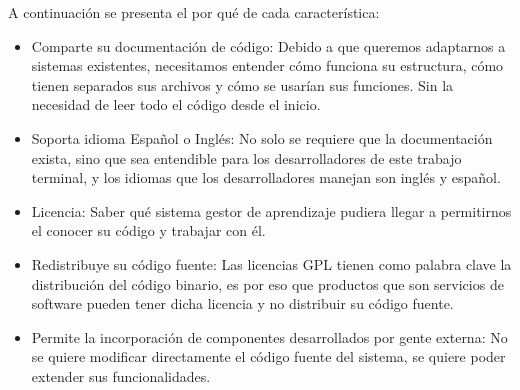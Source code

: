     \noindent A continuación se presenta el por qué de cada característica:
    \begin{itemize}
        \item Comparte su documentación de código: Debido a que queremos adaptarnos a sistemas existentes, necesitamos entender cómo funciona su estructura, cómo tienen separados sus archivos y cómo se usarían sus funciones. Sin la necesidad de leer todo el código desde el inicio. 
        \item Soporta idioma Español o Inglés: No solo se requiere que la documentación exista, sino que sea entendible para los desarrolladores de este trabajo terminal, y los idiomas que los desarrolladores manejan son inglés y español.
        \item Licencia: Saber qué sistema gestor de aprendizaje pudiera llegar a permitirnos el conocer su código y trabajar con él.
        \item Redistribuye su código fuente: Las licencias GPL tienen como palabra clave la distribución del código binario, es por eso que productos que son servicios de software pueden tener dicha licencia y no distribuir su código fuente.
        \item Permite la incorporación de componentes desarrollados por gente externa: No se quiere modificar directamente el código fuente del sistema, se quiere poder extender sus funcionalidades.
    \end{itemize}
       
 

  
    
